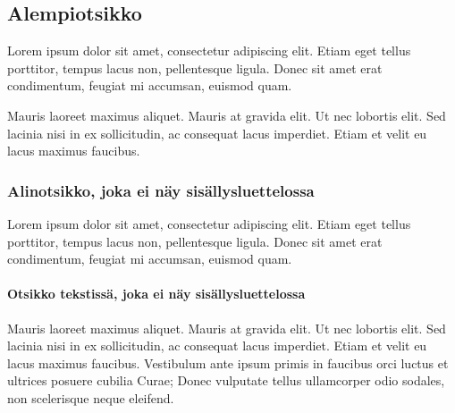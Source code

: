 \subsection{Alempiotsikko}
\label{Alempiotsikko}

Lorem ipsum dolor sit amet, consectetur adipiscing elit. Etiam eget tellus porttitor, tempus lacus non, pellentesque ligula. Donec sit amet erat condimentum, feugiat mi accumsan, euismod quam.

Mauris laoreet maximus aliquet. Mauris at gravida elit. Ut nec lobortis elit. Sed lacinia nisi in ex sollicitudin, ac consequat lacus imperdiet. Etiam et velit eu lacus maximus faucibus.

\subsubsection{Alinotsikko, joka ei näy sisällysluettelossa}
\label{Alinotsikko}

Lorem ipsum dolor sit amet, consectetur adipiscing elit. Etiam eget tellus porttitor, tempus lacus non, pellentesque ligula. Donec sit amet erat condimentum, feugiat mi accumsan, euismod quam.

\paragraph{Otsikko tekstissä, joka ei näy sisällysluettelossa}Mauris laoreet maximus aliquet. Mauris at gravida elit. Ut nec lobortis elit. Sed lacinia nisi in ex sollicitudin, ac consequat lacus imperdiet. Etiam et velit eu lacus maximus faucibus. Vestibulum ante ipsum primis in faucibus orci luctus et ultrices posuere cubilia Curae; Donec vulputate tellus ullamcorper odio sodales, non scelerisque neque eleifend. 
